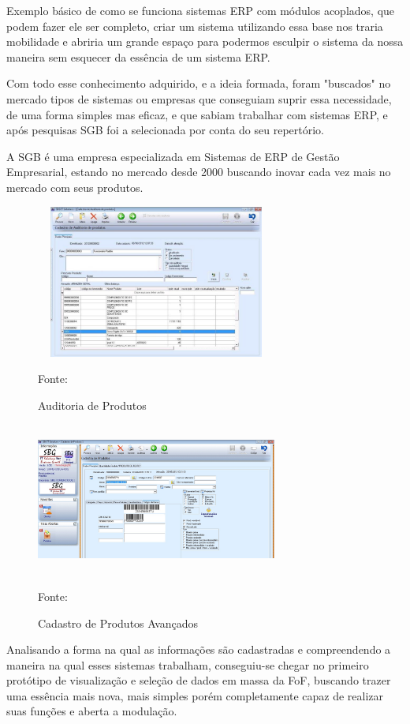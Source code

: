 Exemplo básico de como se funciona sistemas ERP com módulos acoplados, que podem fazer ele ser completo, criar um sistema utilizando essa base nos traria mobilidade e abriria um grande espaço para podermos esculpir o sistema da nossa maneira sem esquecer da essência de um sistema ERP.

Com todo esse conhecimento adquirido, e a ideia formada, foram "buscados" no mercado tipos de sistemas ou empresas que conseguiam suprir essa necessidade, de uma forma simples mas eficaz, e que sabiam trabalhar com sistemas ERP, e após pesquisas SGB foi a selecionada por conta do seu repertório. 

A SGB é uma empresa especializada em Sistemas de ERP de Gestão Empresarial, estando no mercado desde 2000 buscando inovar cada vez mais no mercado com seus produtos.

\begin{figure}[!h]
	\centering
	\caption{Auditoria de Produtos}
	\includegraphics[width=300px, height=190px]{./images/SGB1.jpg}
	\par{Fonte: \cite{sbg}}
\end{figure}

\begin{figure}[!h]
	\centering
	\caption{Cadastro de Produtos Avançados}
	\includegraphics[width=300px, height=190px]{./images/SBG2.jpg}
	\par{Fonte: \cite{sbg-1}}
\end{figure}
\newpage

Analisando a forma na qual as informações são cadastradas e compreendendo a maneira na qual esses sistemas trabalham, conseguiu-se chegar no primeiro protótipo de visualização e seleção de dados em massa da FoF, buscando trazer uma essência mais nova, mais simples porém completamente capaz de realizar suas funções e aberta a modulação.

